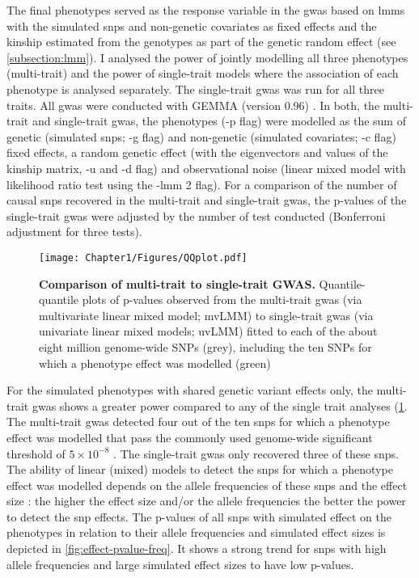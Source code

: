 The final phenotypes served as the response variable in the \gls{gwas} based on \glspl{lmm} with the simulated \glspl{snp} and non-genetic covariates as fixed effects and the kinship estimated from the genotypes as part of the genetic random effect \citep{Zhou2014} (see \cref{subsection:lmm}). I analysed the power of jointly modelling all three phenotypes (multi-trait) and the power of single-trait models where the association of each phenotype is analysed separately. The single-trait \gls{gwas} was run for all three traits. All \gls{gwas} were conducted with GEMMA (version 0.96) \citep{Zhou2014}. In both, the multi-trait and single-trait \gls{gwas}, the phenotypes (-p flag) were modelled as the sum of genetic (simulated \glspl{snp}; -g flag) and non-genetic (simulated covariates; -c flag) fixed effects, a random genetic effect (with the eigenvectors and values of the kinship matrix, -u and -d flag) and observational noise (linear mixed model with likelihood ratio test using the -lmm 2 flag). For a comparison of the number of causal \glspl{snp} recovered in the multi-trait and single-trait \gls{gwas}, the p-values of the single-trait \gls{gwas} were adjusted by the number of test conducted (Bonferroni adjustment for three tests).

\begin{figure}[h]
	\centering
	\texttt{[image: Chapter1/Figures/QQplot.pdf]}
	\caption[\textbf{Comparison of multi-trait to single-trait GWAS.}]{\textbf{Comparison of multi-trait to single-trait GWAS.} Quantile-quantile plots of p-values observed from the multi-trait \gls{gwas} (via multivariate linear mixed model; mvLMM) to single-trait \gls{gwas} (via  univariate linear mixed models; uvLMM) fitted to each of the about eight million genome-wide SNPs (grey), including the ten SNPs for which a phenotype effect was modelled (green)}
	\label{fig:gwas-simulation}
\end{figure}

For the simulated phenotypes with shared genetic variant effects only, the multi-trait \gls{gwas} shows a greater power compared to any of the single trait analyses (\cref{fig:gwas-simulation}. The multi-trait \gls{gwas} detected four out of the ten \glspl{snp} for which a phenotype effect was modelled that pass the commonly used genome-wide significant threshold of \(5 \times 10^{-8}\) \citep{Fadista2016}. The single-trait \gls{gwas} only recovered three of these \glspl{snp}. The ability of linear (mixed) models to detect the \glspl{snp} for which a phenotype effect was modelled depends on the allele frequencies of these \glspl{snp} and the effect size \citep{Cohen1992,Halsey2015}: the higher the effect size and/or the allele frequencies the better the power to detect the \gls{snp} effects. The p-values of all \glspl{snp} with simulated effect on the phenotypes in relation to their allele frequencies and simulated effect sizes is depicted in \cref{fig:effect-pvalue-freq}. It shows a strong trend for \glspl{snp} with high allele frequencies and large simulated effect sizes to have low p-values. 

